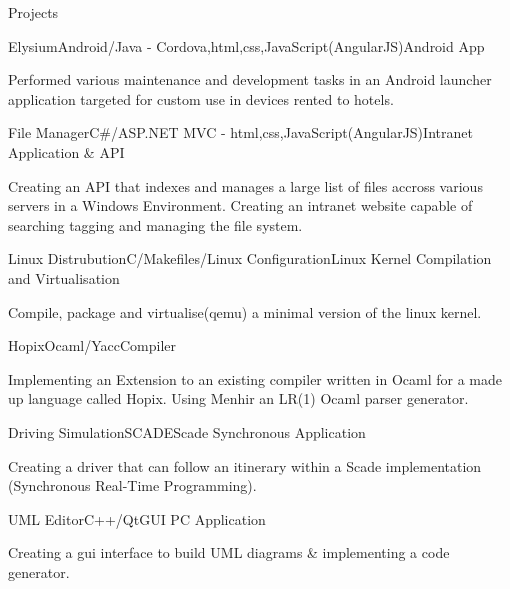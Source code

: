\documentclass{resume} %
\begin{document}

\begin{rSection}{Projects}

\begin{rSubsection}{Elysium}{Android/Java - Cordova,html,css,JavaScript(AngularJS)}{Android App }{}
	\item Performed various maintenance and development tasks in an Android launcher application targeted for custom use in devices rented to hotels. 
\end{rSubsection}


\begin{rSubsection}{File Manager}{C\#/ASP.NET MVC - html,css,JavaScript(AngularJS)}{Intranet Application \& API}{}
	\item Creating an API that indexes and manages a large list of files accross various servers in a Windows Environment. Creating an intranet website capable of searching tagging and managing the file system.
\end{rSubsection}

\begin{rSubsection}{Linux Distrubution}{C/Makefiles/Linux Configuration}{Linux Kernel Compilation and Virtualisation}{}
	\item Compile, package and virtualise(qemu) a minimal version of the linux kernel. 
\end{rSubsection}

\begin{rSubsection}{Hopix}{Ocaml/Yacc}{Compiler}{}
	\item Implementing an Extension to an existing compiler written in Ocaml for a made up language called Hopix. Using Menhir an LR(1) Ocaml parser generator.
\end{rSubsection}

\begin{rSubsection}{Driving Simulation}{SCADE}{Scade Synchronous Application}{}
	\item Creating a driver that can follow an itinerary within a Scade implementation (Synchronous Real-Time Programming).
\end{rSubsection}

\begin{rSubsection}{UML Editor}{C++/Qt}{GUI PC Application}{}
	\item Creating a gui interface to build UML diagrams \& implementing a code generator.
\end{rSubsection}


\end{rSection}
\end{document}
